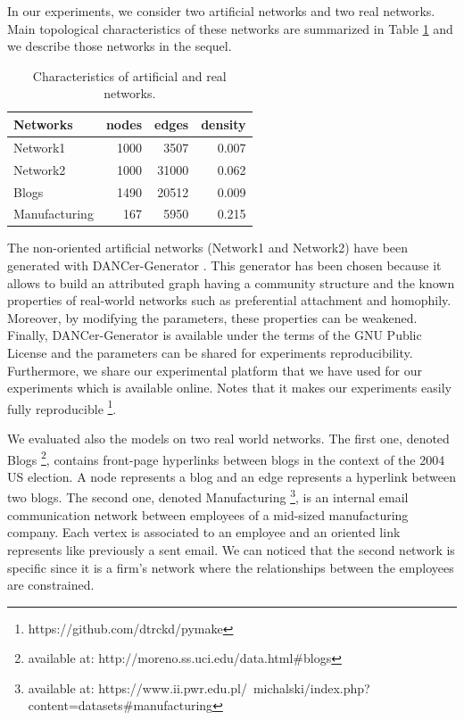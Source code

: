In our experiments, we consider two artificial networks and two real networks.  Main topological characteristics of these networks are summarized in Table \ref{table:networks_measures} and we describe those networks in the sequel.

\begin{table}[h] 
	\centering
	\caption{Characteristics of artificial and real networks.}
    \begin{tabular}{lrrr}
        \hline
        \textbf{Networks} &   nodes &   edges &   density \\
        \hline
        Network1 &    1000 &    3507 &     0.007 \\
        Network2 &    1000 &   31000 &     0.062 \\
        Blogs         &    1490 &   20512 &     0.009 \\
        Manufacturing &     167 &    5950 &     0.215 \\
    \hline
    \end{tabular}
	\label{table:networks_measures}
\end{table}

The non-oriented artificial networks (Network1 and Network2) have been generated with DANCer-Generator \cite{largeron2015}. This generator has been chosen because it allows to build an attributed graph having a community structure  and  the known properties of real-world networks such as preferential attachment and homophily.
Moreover, by modifying the parameters, these properties can be weakened. Finally, DANCer-Generator is available under the terms of the GNU Public License and the parameters can be shared for experiments reproducibility. Furthermore, we share our experimental platform that we have used for our experiments which is available online. Notes that it makes our experiments easily fully reproducible \footnote{https://github.com/dtrckd/pymake}.


We evaluated also the models on two real world networks.
The first one, denoted Blogs \footnote{available at: http://moreno.ss.uci.edu/data.html\#blogs}, contains front-page hyperlinks between blogs in the context of the 2004 US election. A node represents a blog and an edge represents a hyperlink between two blogs.
The second one, denoted Manufacturing \footnote{available at: https://www.ii.pwr.edu.pl/~michalski/index.php?content=datasets\#manufacturing}, is an internal email communication network between employees of a mid-sized manufacturing company. Each vertex is associated  to an employee and an oriented link represents like previously a sent email. We can noticed that the second network is specific since it is a firm's network where the relationships between the employees are constrained. 


